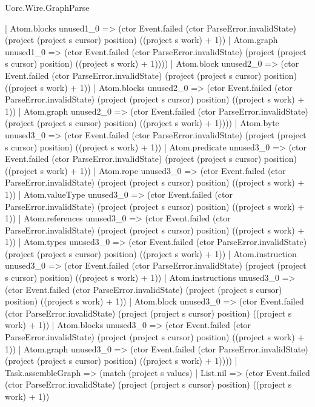 \begin{lexlean}{Uorc.Wire.GraphParse}
\begin{semanticmodule}
{                  | Atom.blocks unused1_0 => (ctor Event.failed (ctor ParseError.invalidState) (project (project s cursor) position) ((project s work) + 1))
                  | Atom.graph unused1_0 => (ctor Event.failed (ctor ParseError.invalidState) (project (project s cursor) position) ((project s work) + 1))))
              | Atom.block unused2_0 => (ctor Event.failed (ctor ParseError.invalidState) (project (project s cursor) position) ((project s work) + 1))
              | Atom.blocks unused2_0 => (ctor Event.failed (ctor ParseError.invalidState) (project (project s cursor) position) ((project s work) + 1))
              | Atom.graph unused2_0 => (ctor Event.failed (ctor ParseError.invalidState) (project (project s cursor) position) ((project s work) + 1))))
          | Atom.byte unused3_0 => (ctor Event.failed (ctor ParseError.invalidState) (project (project s cursor) position) ((project s work) + 1))
          | Atom.predicate unused3_0 => (ctor Event.failed (ctor ParseError.invalidState) (project (project s cursor) position) ((project s work) + 1))
          | Atom.rope unused3_0 => (ctor Event.failed (ctor ParseError.invalidState) (project (project s cursor) position) ((project s work) + 1))
          | Atom.valueType unused3_0 => (ctor Event.failed (ctor ParseError.invalidState) (project (project s cursor) position) ((project s work) + 1))
          | Atom.references unused3_0 => (ctor Event.failed (ctor ParseError.invalidState) (project (project s cursor) position) ((project s work) + 1))
          | Atom.types unused3_0 => (ctor Event.failed (ctor ParseError.invalidState) (project (project s cursor) position) ((project s work) + 1))
          | Atom.instruction unused3_0 => (ctor Event.failed (ctor ParseError.invalidState) (project (project s cursor) position) ((project s work) + 1))
          | Atom.instructions unused3_0 => (ctor Event.failed (ctor ParseError.invalidState) (project (project s cursor) position) ((project s work) + 1))
          | Atom.block unused3_0 => (ctor Event.failed (ctor ParseError.invalidState) (project (project s cursor) position) ((project s work) + 1))
          | Atom.blocks unused3_0 => (ctor Event.failed (ctor ParseError.invalidState) (project (project s cursor) position) ((project s work) + 1))
          | Atom.graph unused3_0 => (ctor Event.failed (ctor ParseError.invalidState) (project (project s cursor) position) ((project s work) + 1))))
      | Task.assembleGraph => (match (project s values)
        | List.nil => (ctor Event.failed (ctor ParseError.invalidState) (project (project s cursor) position) ((project s work) + 1))
}
\end{semanticmodule}
\end{lexlean}
